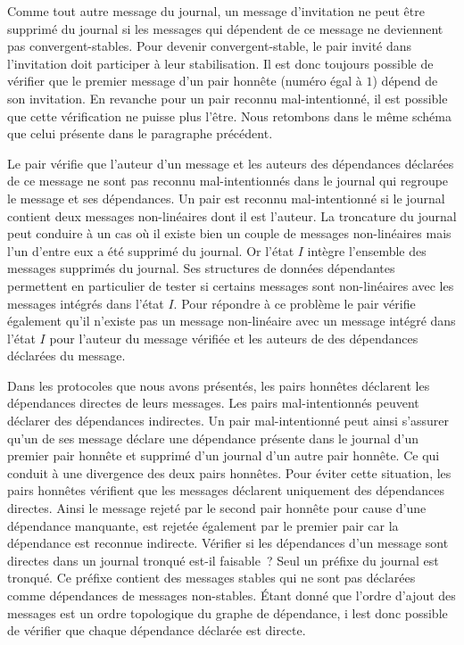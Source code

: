 Comme tout autre message du journal, un message d'invitation ne peut être supprimé du journal si les messages qui dépendent de ce message ne deviennent pas convergent-stables.
Pour devenir convergent-stable, le pair invité dans l'invitation doit participer à leur stabilisation.
Il est donc toujours possible de vérifier que le premier message d'un pair honnête (numéro égal à $1$) dépend de son invitation.
En revanche pour un pair reconnu mal-intentionné, il est possible que cette vérification ne puisse plus l'être.
Nous retombons dans le même schéma que celui présente dans le paragraphe précédent.

Le pair vérifie que l'auteur d'un message et les auteurs des dépendances déclarées de ce message ne sont pas reconnu mal-intentionnés dans le journal qui regroupe le message et ses dépendances.
Un pair est reconnu mal-intentionné si le journal contient deux messages non-linéaires dont il est l'auteur.
La troncature du journal peut conduire à un cas où il existe bien un couple de messages non-linéaires mais l'un d'entre eux a été supprimé du journal.
Or l'état $I$ intègre l'ensemble des messages supprimés du journal.
Ses structures de données dépendantes permettent en particulier de tester si certains messages sont non-linéaires avec les messages intégrés dans l'état $I$.
Pour répondre à ce problème le pair vérifie également qu'il n'existe pas un message non-linéaire avec un message intégré dans l'état $I$ pour l'auteur du message vérifiée et les auteurs de des dépendances déclarées du message.

Dans les protocoles que nous avons présentés, les pairs honnêtes déclarent les dépendances directes de leurs messages.
Les pairs mal-intentionnés peuvent déclarer des dépendances indirectes.
Un pair mal-intentionné peut ainsi s'assurer qu'un de ses message déclare une dépendance présente dans le journal d'un premier pair honnête et supprimé d'un journal d'un autre pair honnête.
Ce qui conduit à une divergence des deux pairs honnêtes.
Pour éviter cette situation, les pairs honnêtes vérifient que les messages déclarent uniquement des dépendances directes.
Ainsi le message rejeté par le second pair honnête pour cause d'une dépendance manquante, est rejetée également par le premier pair car la dépendance est reconnue indirecte.
Vérifier si les dépendances d'un message sont directes dans un journal tronqué est-il faisable~?
Seul un préfixe du journal est tronqué.
Ce préfixe contient des messages stables qui ne sont pas déclarées comme dépendances de messages non-stables.
Étant donné que l'ordre d'ajout des messages est un ordre topologique du graphe de dépendance, i lest donc possible de vérifier que chaque dépendance déclarée est directe.


